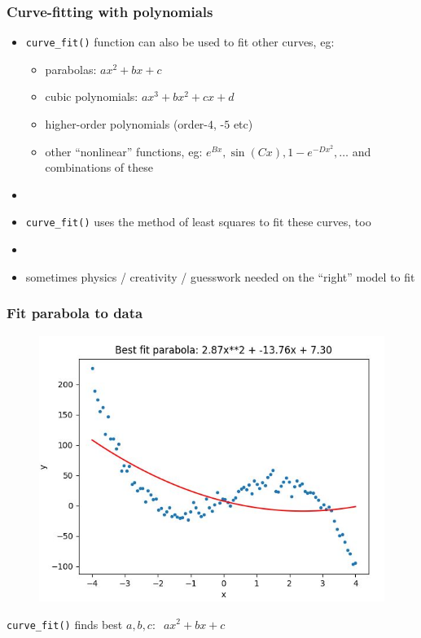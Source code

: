 \documentclass[english,14pt]{beamer}
\begin{document}

\begin{frame}[fragile]

\frametitle{Curve-fitting with polynomials}

\begin{itemize}
	\item \texttt{curve\_fit()} function can also be used to fit other curves, eg:
	\begin{itemize}
		\item parabolas: $ax^2 + bx + c$
		\item cubic polynomials: $ax^3 + bx^2 + cx + d$
		\item higher-order polynomials (order-$4$, -$5$ etc)
		\item other ``nonlinear'' functions, eg: $e^{Bx}, \sin(Cx), 1 - e^{-Dx^2}, \ldots$ and combinations of these 
	\end{itemize}
	\item[]	
	\item \texttt{curve\_fit()} uses the method of least squares to fit these curves, too
	\item[]
	\item sometimes physics / creativity / guesswork needed on the ``right'' model to fit
\end{itemize}

\end{frame}


\begin{frame}[fragile]

\frametitle{Fit parabola to data}
\vspace*{-5mm}
\begin{figure}[ht]
	\centering
	\includegraphics[width=.7\textwidth]{figures/nonlinearguess1output}
\end{figure}
\vspace*{-5mm}
\texttt{curve\_fit()} finds best $a, b, c: \;\; ax^2 + bx + c$

\end{frame}
\end{document}

